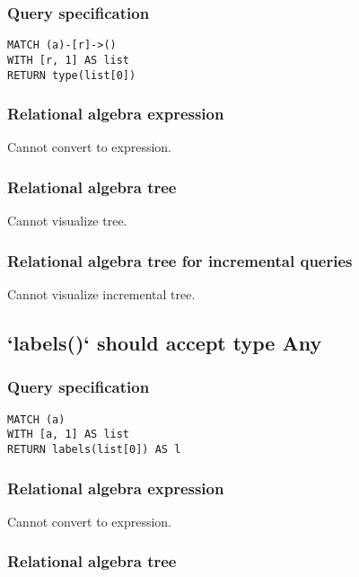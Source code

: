 \subsubsection*{Query specification}

\begin{lstlisting}
MATCH (a)-[r]->()
WITH [r, 1] AS list
RETURN type(list[0])
\end{lstlisting}

\subsubsection*{Relational algebra expression}

Cannot convert to expression.

\subsubsection*{Relational algebra tree}

Cannot visualize tree.

\subsubsection*{Relational algebra tree for incremental queries}

Cannot visualize incremental tree.

\subsection{`labels()` should accept type Any}

\subsubsection*{Query specification}

\begin{lstlisting}
MATCH (a)
WITH [a, 1] AS list
RETURN labels(list[0]) AS l
\end{lstlisting}

\subsubsection*{Relational algebra expression}

Cannot convert to expression.

\subsubsection*{Relational algebra tree}

